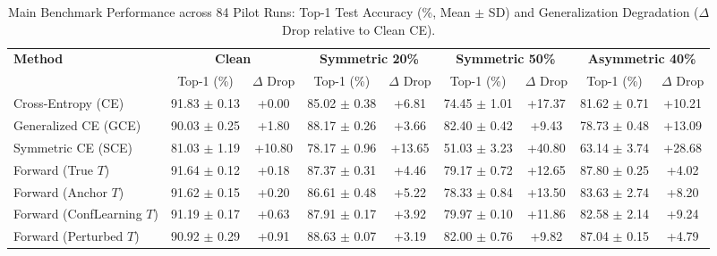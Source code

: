 \begin{table}[t]
\centering
\caption{Main Benchmark Performance across 84 Pilot Runs: Top-1 Test Accuracy (\%, Mean $\pm$ SD) and Generalization Degradation ($\Delta$ Drop relative to Clean CE).}
\label{tab:main_performance}
\small
\begin{tabular}{lcccccccc}
\hline
\textbf{Method} & \multicolumn{2}{c}{\textbf{Clean}} & \multicolumn{2}{c}{\textbf{Symmetric 20\%}} & \multicolumn{2}{c}{\textbf{Symmetric 50\%}} & \multicolumn{2}{c}{\textbf{Asymmetric 40\%}} \\
 & Top-1 (\%) & $\Delta$ Drop & Top-1 (\%) & $\Delta$ Drop & Top-1 (\%) & $\Delta$ Drop & Top-1 (\%) & $\Delta$ Drop \\
\hline
Cross-Entropy (CE) & 91.83 $\pm$ 0.13 & +0.00 & 85.02 $\pm$ 0.38 & +6.81 & 74.45 $\pm$ 1.01 & +17.37 & 81.62 $\pm$ 0.71 & +10.21 \\
Generalized CE (GCE) & 90.03 $\pm$ 0.25 & +1.80 & 88.17 $\pm$ 0.26 & +3.66 & 82.40 $\pm$ 0.42 & +9.43 & 78.73 $\pm$ 0.48 & +13.09 \\
Symmetric CE (SCE) & 81.03 $\pm$ 1.19 & +10.80 & 78.17 $\pm$ 0.96 & +13.65 & 51.03 $\pm$ 3.23 & +40.80 & 63.14 $\pm$ 3.74 & +28.68 \\
Forward (True $T$) & 91.64 $\pm$ 0.12 & +0.18 & 87.37 $\pm$ 0.31 & +4.46 & 79.17 $\pm$ 0.72 & +12.65 & 87.80 $\pm$ 0.25 & +4.02 \\
Forward (Anchor $T$) & 91.62 $\pm$ 0.15 & +0.20 & 86.61 $\pm$ 0.48 & +5.22 & 78.33 $\pm$ 0.84 & +13.50 & 83.63 $\pm$ 2.74 & +8.20 \\
Forward (ConfLearning $T$) & 91.19 $\pm$ 0.17 & +0.63 & 87.91 $\pm$ 0.17 & +3.92 & 79.97 $\pm$ 0.10 & +11.86 & 82.58 $\pm$ 2.14 & +9.24 \\
Forward (Perturbed $T$) & 90.92 $\pm$ 0.29 & +0.91 & 88.63 $\pm$ 0.07 & +3.19 & 82.00 $\pm$ 0.76 & +9.82 & 87.04 $\pm$ 0.15 & +4.79 \\
\hline
\end{tabular}
\end{table}
